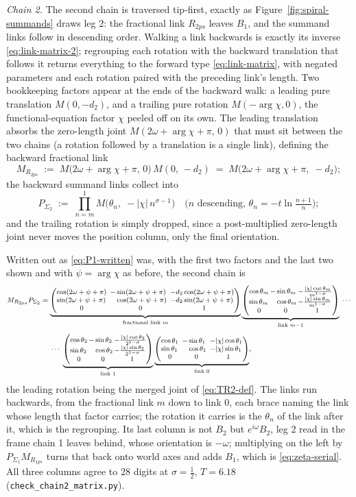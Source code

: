 \documentclass[11pt]{article}
\makeatletter
\theoremstyle{definition}
\newcommand{\linkmatx}[2]{%
\left(\begin{array}{@{}l@{\,}l@{\,}l@{}}
\cos #1 & -\sin #1           & -\frac{|\chi|\cos #1}{#2}\\[1pt]
\sin #1 & \phantom{-}\cos #1 & -\frac{|\chi|\sin #1}{#2}\\[1pt]
\multicolumn{1}{@{}c@{\,}}{0} & \multicolumn{1}{c@{\,}}{0} & \multicolumn{1}{c@{}}{1}
\end{array}\right)}
\newcommand{\linkmat}[2]{%
\left(\begin{array}{@{}l@{\ \,}l@{\ \,}l@{}}
\cos #1 & -\sin #1           & #2\cos #1\\
\sin #1 & \phantom{-}\cos #1 & #2\sin #1\\
\multicolumn{1}{@{}c@{\ \,}}{0} & \multicolumn{1}{c@{\ \,}}{0} & \multicolumn{1}{c@{}}{1}
\end{array}\right)}
\makeatother
\begin{document}
\emph{Chain 2.} The second chain is traversed tip-first, exactly as
Figure~\ref{fig:spiral-summands} draws leg 2: the fractional link
$R_{2ps}$ leaves $B_1$, and the summand links follow in descending order.
Walking a link backwards is exactly its inverse \eqref{eq:link-matrix-2};
regrouping each rotation with the backward translation that follows it
returns everything to the forward type \eqref{eq:link-matrix}, with
negated parameters and each rotation paired with the preceding link's
length. Two bookkeeping factors appear at the ends of the backward walk: a
leading pure translation $M(0,-d_2)$, and a trailing pure rotation
$M(-\arg\chi,0)$, the functional-equation factor $\chi$ peeled off on its
own. The leading translation absorbs the zero-length joint
$M(2\omega+\arg\chi+\pi,\,0)$ that must sit between the two chains (a
rotation followed by a translation is a single link), defining the
backward fractional link
\begin{equation}\label{eq:TR2-def}
M_{R_{2ps}}
\;:=\;
M\bigl(2\omega+\arg\chi+\pi,\,0\bigr)\,M(0,\,-d_2)
\;=\;
M\bigl(2\omega+\arg\chi+\pi,\;-d_2\bigr);
\end{equation}
the backward summand links collect into
\begin{equation}\label{eq:P2-def}
P_{\Sigma_2}
\;:=\;
\prod_{n=m}^{1}M\bigl(\theta_n,\;-|\chi|\,n^{\sigma-1}\bigr)
\quad\text{($n$ descending, $\theta_n=-t\ln\tfrac{n+1}{n}$)};
\end{equation}
and the trailing rotation is simply dropped, since a post-multiplied
zero-length joint never moves the position column, only the final
orientation.

Written out as \eqref{eq:P1-written} was, with the first two factors and the last
two shown and with $\psi=\arg\chi$ as before, the second chain is
\begin{equation}\label{eq:P2-written}
\footnotesize
\begin{aligned}
M_{R_{2ps}}P_{\Sigma_2}
&=\underbrace{\linkmat{(2\omega+\psi+\pi)}{-d_2}}_{\text{fractional link }m}
\underbrace{\linkmatx{\theta_m}{m^{1-\sigma}}}_{\text{link }m-1}\;\cdots\\[3pt]
&\hphantom{{}={}}\cdots\;
\underbrace{\linkmatx{\theta_2}{2^{1-\sigma}}}_{\text{link }1}
\underbrace{\linkmat{\theta_1}{-|\chi|}}_{\text{link }0},
\end{aligned}
\end{equation}
the leading rotation being the merged joint of \eqref{eq:TR2-def}. The links run
backwards, from the fractional link $m$ down to link $0$, each brace naming the
link whose length that factor carries; the rotation it carries is the $\theta_n$
of the link after it, which is the regrouping. Its
last column is not $B_2$ but $e^{i\omega}B_2$, leg 2 read in the frame chain 1
leaves behind, whose orientation is $-\omega$; multiplying on the left by
$P_{\Sigma_1}M_{R_{1ps}}$ turns that back onto world axes and adds $B_1$, which
is \eqref{eq:zeta-serial}. All three columns agree to $28$ digits at
$\sigma=\tfrac12$, $T=6.18$ (\texttt{check\_chain2\_matrix.py}).
\end{document}
